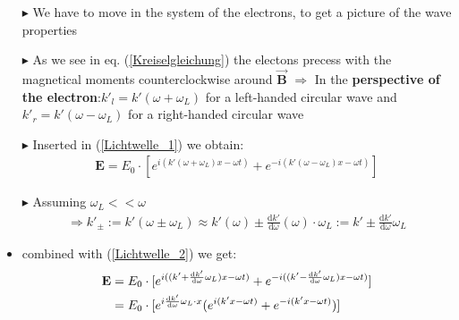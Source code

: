 \documentclass[11pt,a4paper]{beamer}
\begin{document}
\begin{frame}
\begin{itemize}
\item[$\blacktriangleright$] We have to move in the system of the electrons, to get a picture of the wave properties
\item[$\blacktriangleright$] As we see in eq. (\ref{Kreiselgleichung}) the electons precess with the magnetical moments counterclockwise around $\vec{\textbf{B}}$\newline\newline
$\Rightarrow$ In the \textbf{perspective of the electron}:\newline $k'_l = k'(\omega + \omega_L)$ for a left-handed circular wave and $k'_r = k'(\omega - \omega_L)$ for a right-handed circular wave
\item[$\blacktriangleright$] Inserted in (\ref{Lichtwelle_1}) we obtain:
\begin{align}
\textbf{E} = E_0\cdot[e^{i(k'(\omega + \omega_L) x - \omega t)}+e^{-i(k'(\omega - \omega_L) x - \omega t)}]
\label{Lichtwelle_2}
\end{align}
\end{itemize}
\end{frame}
\begin{frame}
\begin{itemize}
\item[$\blacktriangleright$] Assuming $\omega_L << \omega$
\begin{align*}
\Rightarrow k'_{\pm} := k'(\omega \pm \omega_L) \approx k'(\omega) \pm \frac{\text{d} k'}{\text{d} \omega}(\omega)\cdot\omega_L := k' \pm \frac{\text{d}k'}{\text{d}\omega}\omega_L
\end{align*}
\item combined with (\ref{Lichtwelle_2}) we get:
\begin{align}
\textbf{E}& = E_0\cdot[e^{i((k'+ \frac{\text{d} k'}{\text{d} \omega}\omega_L) x - \omega t)}+e^{-i((k' - \frac{\text{d} k'}{\text{d} \omega}\omega_L) x - \omega t)}] \notag \\
& = E_0\cdot[e^{i\frac{\text{d} k'}{\text{d} \omega}\omega_L \cdot x}(e^{i(k' x - \omega t)}+e^{-i(k' x - \omega t)})]
\label{Lichtwelle_3}
\end{align}
\end{itemize}
\end{frame}
\end{document}
